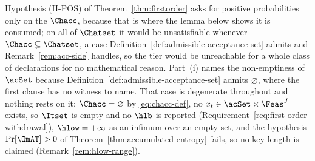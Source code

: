 
Hypothesis (H-POS) of Theorem~\ref{thm:firstorder} asks for positive
probabilities only on the  $\Chacc$, because that
is where the lemma below shows it is consumed; on all of $\Chatset$ it
would be unsatisfiable whenever $\Chacc\subsetneq\Chatset$, a case
Definition~\ref{def:admissible-acceptance-set} admits and Remark~\ref{rem:acc-side} handles, so
the  tier would be unreachable for a whole class of
declarations for no mathematical reason. Part~(i) names the non-emptiness
of $\acSet$ because Definition~\ref{def:admissible-acceptance-set} admits $\varnothing$, where
the first clause has no witness to name. That case is degenerate
throughout and nothing rests on it: $\Chacc=\varnothing$ by
\eqref{eq:chacc-def}, no $x_t\in\acSet\times\Feas^{J}$ exists, so $\Itset$
is empty and no $\hlb$ is reported
(Requirement~\ref{req:first-order-withdrawal}),
$\hlow=+\infty$ as an infimum over an empty set, and the hypothesis
$\Pr[\OmAT]>0$ of Theorem~\ref{thm:accumulated-entropy} fails, so no key
length is claimed (Remark~\ref{rem:hlow-range}).

